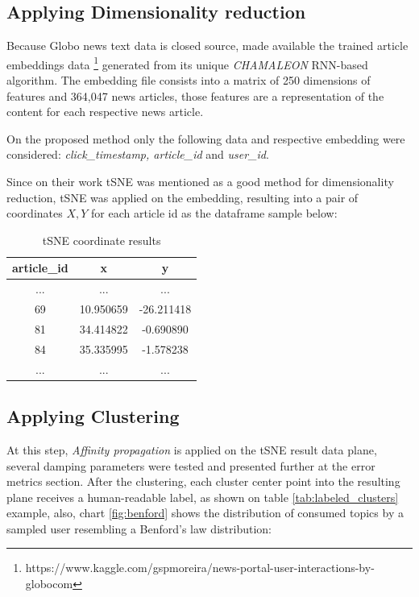 \documentclass[ecp,tc,english]{iiufrgs}
\begin{document}
        \subsection{Applying Dimensionality reduction}
        Because Globo news text data is closed source, \cite{moreira2018chameleon} made available the trained article embeddings data \footnote{https://www.kaggle.com/gspmoreira/news-portal-user-interactions-by-globocom} generated from its unique \textit{CHAMALEON} RNN-based algorithm. The embedding file consists into a matrix of 250 dimensions of features and 364,047 news articles, those features are a representation of the content for each respective news article.
    
        On the proposed method only the following data and respective embedding were considered: \textit{click\_timestamp, article\_id} and \textit{{}user\_id}.
        
    
        Since on their work tSNE was mentioned as a good method for dimensionality reduction, tSNE was applied on the embedding, resulting into a pair of coordinates \(X, Y\) for each article id as the dataframe sample below:
        
        \begin{table}[H]
            \centering
            \begin{tabular}{ |c|c|c| } 
                \hline
                article\_id & x & y \\
                \hline 
                ... & ... & ... \\
                69 & 10.950659 & -26.211418 \\ 
                81 & 34.414822 & -0.690890 \\ 
                84 & 35.335995 & -1.578238 \\ 
                ... & ... & ... \\
                \hline
            \end{tabular}
            \caption{tSNE coordinate results}
            \label{tab:tsne_results}
        \end{table}
        
        \newpage
        
        \subsection{Applying Clustering}
        At this step, \textit{Affinity propagation} is applied on the tSNE result data plane, several damping parameters were tested and presented further at the error metrics section. 
        After the clustering, each cluster center point into the resulting plane receives a human-readable label, as shown on table \ref{tab:labeled_clusters} example, also, chart \ref{fig:benford} shows the distribution of consumed topics by a sampled user resembling a Benford's law distribution:
        
\end{document}
